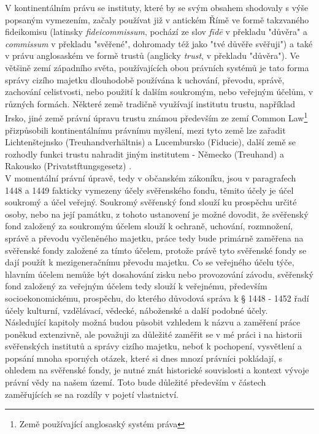 \documentclass{article}
\begin{document}
\newpage

\indent V kontinentálním právu se instituty, které by se svým obsahem shodovaly s výše popsaným vymezením, začaly používat již v antickém Římě ve formě takzvaného fideikomisu (latinsky \textit{fideicommissum}, pochází ze slov \textit{fīdē} v překladu "důvěra" a \textit{commissum} v překladu "svěřené", dohromady též jako "tvé důvěře svěřuji") a také v právu anglosaském ve formě trustů (anglicky \textit{trust}, v překladu "důvěra"). Ve většině zemí západního světa, používajících obou právních systém\-ů je tato forma správy cizího majetku dlouhodobě používána k uchování, převodu, správě, zachování celistvosti, nebo použití k dalším soukromým, nebo veřejným účelům, v různých formách. Některé země tradičně využívají institutu trustu, například Irsko, jiné země právní úpravu trustu známou především ze zemí Common Law\footnote{Země používající anglosaský systém práva} přizpůsobili kontinentálnímu právnímu myšlení, mezi tyto země lze zařadit Lichtenštejnsko (Treuhandverhältnis) a Lucembursko (Fiducie), další země se rozhodly funkci trustu nahradit jiným institutem - Německo (Treuhand) a Rakousko (Privatstftungsgesetz) . \\

\indent V momentální právní úpravě, tedy v občanském zákoníku, jsou v paragrafech 1448 a 1449 fakticky vymezeny účely svěřenského fondu, těmito účely je účel soukromý a účel veřejný. Soukromý svěřenský fond slouží ku prospěchu určité osoby, nebo na její památku, z tohoto ustanovení je možné dovodit, že svěřenský fond založený za soukromým účelem slouží k ochraně, uchování, rozmnožení, správě a převodu vyčleněného majetku, práce tedy bude primárně zaměřena na svěřenské fondy založené za tímto účelem, protože právě tyto svěřenské fondy se dají použít k mezigeneračnímu převodu majetku. Co se veřejného účelu týče, hlavním účelem nemůže být dosahování zisku nebo provozování závodu, svěřenský fond založený za veřejným účelem tedy slouží k veřejnému, především socioekonomickému, prospěchu, do kterého důvodová správa k § 1448 - 1452 řadí účely kulturní, vzdělávací, vědecké, náboženské a další podobné účely. \\

Následující kapitoly možná budou působit vzhledem k názvu a zaměření práce poněkud extenzivně, ale považuji za důležité zaměřit se v mé práci i na historii svěřenských institutů a správy cizího majetku, neboť k pochopení, vysvětlení a popsání mnoha sporných otázek, které si dnes mnozí právníci pokládají, s ohledem na svěřenské fondy, je nutné znát historické souvislosti a kontext vývoje právní vědy na našem území. Toto bude důležité především v částech zaměřujících se na rozdíly v pojetí vlastnictví. \\
\end{document}
